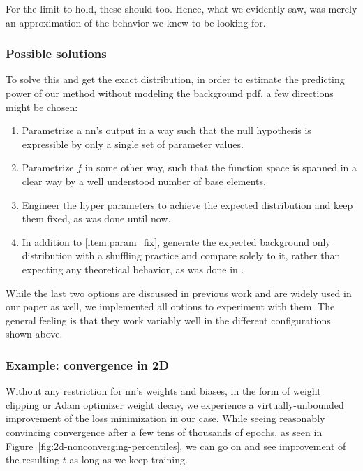 \documentclass[paper/ddppaper2.tex]{subfiles}
\begin{document}
For the limit to hold, these should too. Hence, what we evidently saw, was merely an approximation of the behavior we knew to be looking for.

\subsubsection{Possible solutions}
To solve this and get the exact distribution, in order to estimate the predicting power of our method without modeling the background \gls{pdf}, a few directions might be chosen:

\begin{enumerate}
    \item Parametrize a \gls{nn}'s output in a way such that the null hypothesis is expressible by only a single set of parameter values.
    \item Parametrize $f$ in some other way, such that the function space is spanned in a clear way by a well understood number of base elements.
    \item Engineer the hyper parameters to achieve the expected distribution and keep them fixed, as was done until now. \label{item:param_fix}
    \item In addition to \ref{item:param_fix}, generate the expected background only distribution with a shuffling practice and compare solely to it, rather than expecting any theoretical behavior, as was done in \cite{LastDDPPaper}.
\end{enumerate}

While the last two options are discussed in previous work and are widely used in our paper as well, we implemented all options to experiment with them. The general feeling is that they work variably well in the different configurations shown above.

\subsubsection{Example: convergence in 2D}

Without any restriction for \gls{nn}'s weights and biases, in the form of weight clipping or Adam optimizer weight decay, we experience a virtually-unbounded improvement of the loss minimization in our case. While seeing reasonably convincing convergence after a few tens of thousands of epochs, as seen in Figure~\ref{fig:2d-nonconverging-percentiles}, we can go on and see improvement of the resulting $t$ as long as we keep training.

\iftrue %
\par\medskip{}\medskip
\fi %
\end{document}
